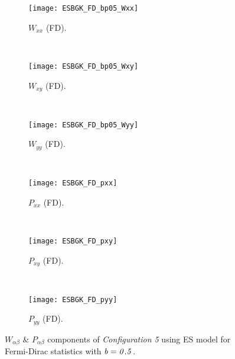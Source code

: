 \documentclass{rsproca}%
\begin{document}
\begin{figure}
        \centering
        \begin{subfigure}[b]{0.32\textwidth}
                \centering
                \texttt{[image: ESBGK\_FD\_bp05\_Wxx]}
                \caption{$W_{xx}$ (FD).}
                \label{fig:5ESBGK_FD_bp05_Wxx}
        \end{subfigure}%
        ~ %
        \begin{subfigure}[b]{0.32\textwidth}
                \centering
                \texttt{[image: ESBGK\_FD\_bp05\_Wxy]}
                \caption{$W_{xy}$ (FD).}
                \label{fig:5ESBGK_FD_bp05_Wxy}
        \end{subfigure}
        ~ %
        \begin{subfigure}[b]{0.32\textwidth}
                \centering
                \texttt{[image: ESBGK\_FD\_bp05\_Wyy]}
                \caption{$W_{yy}$ (FD).}
                \label{fig:5ESBGK_FD_bp05_Wyy}
        \end{subfigure}
				~ %
				\begin{subfigure}[b]{0.32\textwidth}
                \centering
                \texttt{[image: ESBGK\_FD\_pxx]}
                \caption{$P_{xx}$ (FD).}
                \label{fig:ESBGK_FD_pxx}
        \end{subfigure}%
        ~ %
        \begin{subfigure}[b]{0.32\textwidth}
                \centering
                \texttt{[image: ESBGK\_FD\_pxy]}
                \caption{$P_{xy}$ (FD).}
                \label{fig:ESBGK_FD_pxy}
        \end{subfigure}
        ~ %
        \begin{subfigure}[b]{0.32\textwidth}
                \centering
                \texttt{[image: ESBGK\_FD\_pyy]}
                \caption{$P_{yy}$ (FD).}
                \label{fig:ESBGK_FD_pyy}
        \end{subfigure}
        \caption{$W_{\alpha \beta}$ \& $P_{\alpha \beta}$ components of \emph{Configuration 5} using ES model for Fermi-Dirac statistics with $\it{b=0.5}$.}
				\label{fig:conf5_W_p_Tensor2}
\end{figure}
\end{document}
